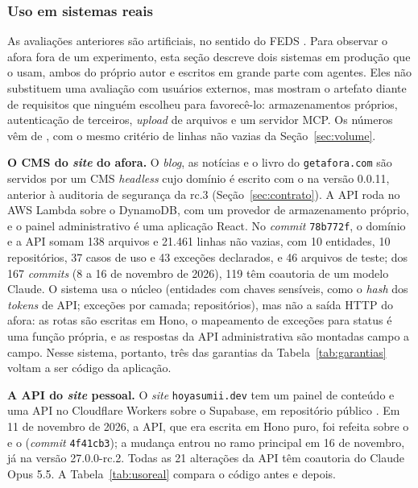 \documentclass[a4paper,12pt]{article}
\newcommand{\estr}[1]{\textit{#1}}
\begin{document}
\subsubsection{Uso em sistemas reais}\label{sec:usoreal}

As avaliações anteriores são artificiais, no sentido do FEDS \citep{venable2016}. Para observar o afora fora de um experimento, esta seção descreve dois sistemas em produção que o usam, ambos do próprio autor e escritos em grande parte com agentes. Eles não substituem uma avaliação com usuários externos, mas mostram o artefato diante de requisitos que ninguém escolheu para favorecê-lo: armazenamentos próprios, autenticação de terceiros, \estr{upload} de arquivos e um servidor MCP. Os números vêm de , com o mesmo critério de linhas não vazias da Seção~\ref{sec:volume}.

\textbf{O CMS do \estr{site} do afora.} O \estr{blog}, as notícias e o livro do \texttt{getafora.com} são servidos por um CMS \estr{headless} cujo domínio é escrito com o  na versão 0.0.11, anterior à auditoria de segurança da rc.3 (Seção~\ref{sec:contrato}). A API roda no AWS Lambda sobre o DynamoDB, com um provedor de armazenamento próprio, e o painel administrativo é uma aplicação React. No \estr{commit} \texttt{78b772f}, o domínio e a API somam 138 arquivos e 21.461 linhas não vazias, com 10 entidades, 10 repositórios, 37 casos de uso e 43 exceções declarados, e 46 arquivos de teste; dos 167 \estr{commits} (8 a 16 de novembro de 2026), 119 têm coautoria de um modelo Claude. O sistema usa o núcleo (entidades com chaves sensíveis, como o \estr{hash} dos \estr{tokens} de API; exceções por camada; repositórios), mas não a saída HTTP do afora: as rotas são escritas em Hono, o mapeamento de exceções para status é uma função própria, e as respostas da API administrativa são montadas campo a campo. Nesse sistema, portanto, três das garantias da Tabela~\ref{tab:garantias} voltam a ser código da aplicação.

\textbf{A API do \estr{site} pessoal.} O \estr{site} \texttt{hoyasumii.dev} tem um painel de conteúdo e uma API no Cloudflare Workers sobre o Supabase, em repositório público \citep{anjos2026site}. Em 11 de novembro de 2026, a API, que era escrita em Hono puro, foi refeita sobre o  e o  (\estr{commit} \texttt{4f41cb3}); a mudança entrou no ramo principal em 16 de novembro, já na versão 27.0.0-rc.2. Todas as 21 alterações da API têm coautoria do Claude Opus 5.5. A Tabela~\ref{tab:usoreal} compara o código antes e depois.
\end{document}
